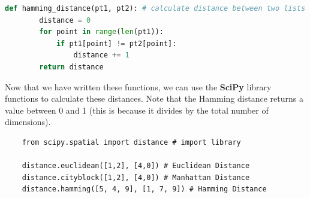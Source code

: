 \documentclass[11pt, a4paper]{article}
\begin{document}
\begin{spacing}{1.1}
	\begin{lstlisting}[language=Python]
	def hamming_distance(pt1, pt2): # calculate distance between two lists
		distance = 0
		for point in range(len(pt1)):
			if pt1[point] != pt2[point]:
				distance += 1
		return distance\end{lstlisting}\vspace*{2mm}
	Now that we have written these functions, we can use the \textbf{SciPy} library functions to calculate these distances. Note that the Hamming distance returns a value between 0 and 1 (this is because it divides by the total number of dimensions).
	\begin{lstlisting}
	from scipy.spatial import distance # import library
	
	distance.euclidean([1,2], [4,0]) # Euclidean Distance
	distance.cityblock([1,2], [4,0]) # Manhattan Distance
	distance.hamming([5, 4, 9], [1, 7, 9]) # Hamming Distance \end{lstlisting} \newpage
	

\end{spacing}
\end{document}
